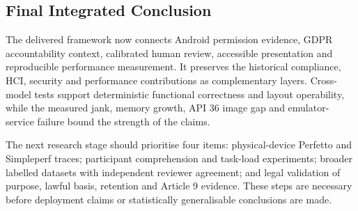 
\subsection{Final Integrated Conclusion}

The delivered framework now connects Android permission evidence, GDPR accountability context, calibrated human review, accessible presentation and reproducible performance measurement. It preserves the historical compliance, HCI, security and performance contributions as complementary layers. Cross-model tests support deterministic functional correctness and layout operability, while the measured jank, memory growth, API 36 image gap and emulator-service failure bound the strength of the claims.

The next research stage should prioritise four items: physical-device Perfetto and Simpleperf traces; participant comprehension and task-load experiments; broader labelled datasets with independent reviewer agreement; and legal validation of purpose, lawful basis, retention and Article 9 evidence. These steps are necessary before deployment claims or statistically generalisable conclusions are made.

